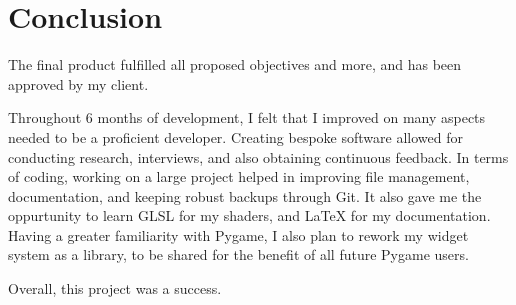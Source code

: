 \documentclass[../main/main.tex]{subfiles}
\begin{document}
\section{Conclusion}
The final product fulfilled all proposed objectives and more, and has been approved by my client.

Throughout 6 months of development, I felt that I improved on many aspects needed to be a proficient developer. Creating bespoke software allowed for conducting research, interviews, and also obtaining continuous feedback. In terms of coding, working on a large project helped in improving file management, documentation, and keeping robust backups through Git. It also gave me the oppurtunity to learn GLSL for my shaders, and LaTeX for my documentation. Having a greater familiarity with Pygame, I also plan to rework my widget system as a library, to be shared for the benefit of all future Pygame users.

Overall, this project was a success.
\end{document}
